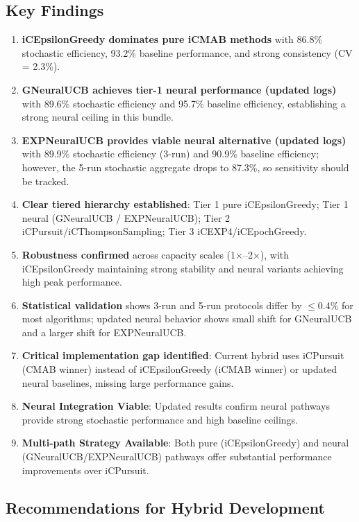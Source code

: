 \documentclass[12pt,a4paper]{article}
\newcommand{\primarytext}[1]{\textcolor{primaryblue}{\textbf{#1}}}
\newcommand{\secondarytext}[1]{\textcolor{secondaryblue}{\textbf{#1}}}
\newcommand{\success}[1]{\textcolor{accentgreen}{\textbf{#1}}}
\newcommand{\warning}[1]{\textcolor{warningred}{\textbf{#1}}}
\newcommand{\legacy}[1]{\textcolor{legacycolor}{\textbf{#1}}}
\newcommand{\neural}[1]{\textcolor{neuralcolor}{\textbf{#1}}}
\begin{document}
\subsection{Key Findings}
\begin{enumerate}
\item \primarytext{iCEpsilonGreedy dominates pure iCMAB methods} with 86.8\% stochastic efficiency, 93.2\% baseline performance, and strong consistency (CV = 2.3\%).
\item \neural{GNeuralUCB achieves tier-1 neural performance (updated logs)} with 89.6\% stochastic efficiency and 95.7\% baseline efficiency, establishing a strong neural ceiling in this bundle.
\item \legacy{EXPNeuralUCB provides viable neural alternative (updated logs)} with 89.9\% stochastic efficiency (3-run) and 90.9\% baseline efficiency; however, the 5-run stochastic aggregate drops to 87.3\%, so sensitivity should be tracked.
\item \secondarytext{Clear tiered hierarchy established}: Tier 1 pure iCEpsilonGreedy; Tier 1 neural (GNeuralUCB / EXPNeuralUCB); Tier 2 iCPursuit/iCThompsonSampling; Tier 3 iCEXP4/iCEpochGreedy.
\item \success{Robustness confirmed} across capacity scales (1$\times$--2$\times$), with iCEpsilonGreedy maintaining strong stability and neural variants achieving high peak performance.
\item \success{Statistical validation} shows 3-run and 5-run protocols differ by $\leq$0.4\% for most algorithms; updated neural behavior shows small shift for GNeuralUCB and a larger shift for EXPNeuralUCB.
\item \warning{Critical implementation gap identified}: Current hybrid uses iCPursuit (CMAB winner) instead of iCEpsilonGreedy (iCMAB winner) or updated neural baselines, missing large performance gains.
\item \neural{Neural Integration Viable}: Updated results confirm neural pathways provide strong stochastic performance and high baseline ceilings.
\item \success{Multi-path Strategy Available}: Both pure (iCEpsilonGreedy) and neural (GNeuralUCB/EXPNeuralUCB) pathways offer substantial performance improvements over iCPursuit.
\end{enumerate}

\subsection{Recommendations for Hybrid Development}
\end{document}
